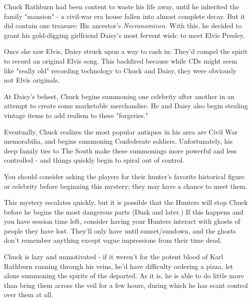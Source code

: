 \documentclass{motw}
\begin{document}

Chuck Rathburn had been content to waste his life away, until he inherited the family "mansion" - a civil-war era house fallen into almost complete decay.  But it did contain one treasure:  His ancestor's \emph{Necronomicon.}  With this, he decided to grant his gold-digging girlfriend Daisy's most fervent wish: to meet Elvis Presley.

Once she saw Elvis, Daisy struck upon a way to cash in:  They'd compel the spirit to record an original Elvis song.  This backfired because while CDs might seem like "really old" recording technology to Chuck and Daisy, they were obviously not Elvis originals.

At Daisy's behest, Chuck begins summoning one celebrity after another in an attempt to create some marketable merchandise.  He and Daisy also begin stealing vintage items to add realism to these "forgeries."

Eventually, Chuck realizes the most popular antiques in his area are Civil War memorabilia, and begins summoning Confederate soldiers.  Unfortunately, his deep family ties to The South make these summonings more powerful and less controlled - and things quickly begin to spiral out of control.


You should consider asking the players for their hunter's favorite historical figure or celebrity before beginning this mystery; they may have a chance to meet them.

This mystery escalates quickly, but it is possible that the Hunters will stop Chuck before he begins the most dangerous parts (Dusk and later.)  If this happens and you have session time left, consider having your Hunters interact with ghosts of people they have lost. They'll only have until sunset/sundown, and the ghosts don't remember anything except vague impressions from their time dead.





Chuck is lazy and unmotivated - if it weren't for the potent blood of Karl Rathburn running through his veins, he'd have difficulty ordering a pizza, let alone summoning the spirits of the departed.  As it is, he is able to do little more than bring them across the veil for a few hours, during which he has scant control over them at all.
\end{document}

